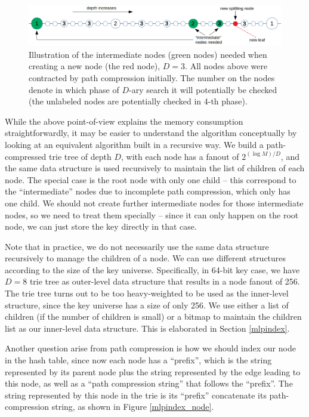 \documentclass[11pt, usletter]{article}
\begin{document}
\begin{figure}[!htb]
  \includegraphics[width=\linewidth]{intermediate_nodes.png}
\caption{Illustration of the intermediate nodes (green nodes) needed when creating a new node (the red node), $D=3$. 
All nodes above were contracted by path compression initially.
The number on the nodes denote in which phase of $D$-ary search 
it will potentially be checked (the unlabeled nodes are potentially checked in 4-th phase).}
\label{intermediate_nodes}
\end{figure}

While the above point-of-view explains the memory consumption straightforwardly, 
it may be easier to understand the algorithm conceptually 
by looking at an equivalent algorithm built in a recursive way. 
We build a path-compressed trie tree of depth $D$, with each node has a fanout of $2^{(\log M)/D}$, 
and the same data structure is used recursively to maintain the list of children of each node.
The special case is the root node with only one child -- 
this correspond to the ``intermediate'' nodes due to incomplete path compression, which only has one child. 
We should not create further intermediate nodes for those intermediate nodes, 
so we need to treat them specially -- since it can only happen on the root node, 
we can just store the key directly in that case. 

Note that in practice, we do not necessarily use the same data structure recursively to manage the children of a node. 
We can use different structures according to the size of the key universe. 
Specifically, in 64-bit key case, we have $D=8$ trie tree as outer-level data structure 
that results in a node fanout of 256. 
The trie tree turns out to be too heavy-weighted to be used as the inner-level structure, 
since the key universe has a size of only 256.
We use either a list of children (if the number of children is small) 
or a bitmap to maintain the children list as our inner-level data structure. 
This is elaborated in Section \ref{mlpindex}.
 
Another question arise from path compression is how we should index our node in the hash table, 
since now each node has a ``prefix'', which is the string represented by its parent node 
plus the string represented by the edge leading to this node, 
as well as a ``path compression string'' that follows the ``prefix''. 
The string represented by this node in the trie is its ``prefix'' concatenate its path-compression string, 
as shown in Figure \ref{mlpindex_node}.
\end{document}
